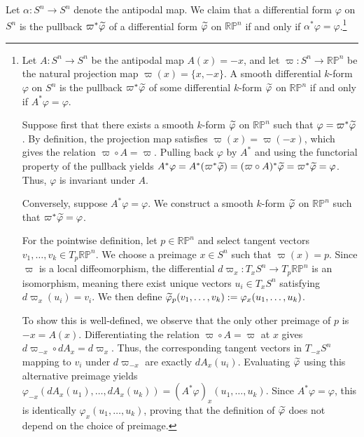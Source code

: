 \documentclass{article}
\begin{document}
	Let $\alpha: S^{n} \to S^{n}$ denote the antipodal map. We claim that a differential form $\varphi$ on $S^{n}$ is the pullback $\varpi^{\ast}\widetilde{\varphi}$ of a differential form $\widetilde{\varphi}$ on $\mathbb{RP}^{n}$ if and only if $\alpha^{\ast}\varphi = \varphi$.\footnote{
	Let $A: S^n \to S^n$ be the antipodal map $A(x) = -x$, and let $\varpi: S^n \to \mathbb{R}\mathbb{P}^n$ be the natural projection map $\varpi(x) = \{x, -x\}$. A smooth differential $k$-form $\varphi$ on $S^n$ is the pullback $\varpi^*\widetilde{\varphi}$ of some differential $k$-form $\widetilde{\varphi}$ on $\mathbb{R}\mathbb{P}^n$ if and only if $A^*\varphi = \varphi$.
	
	Suppose first that there exists a smooth $k$-form $\widetilde{\varphi}$ on $\mathbb{R}\mathbb{P}^n$ such that $\varphi = \varpi^*\widetilde{\varphi}$. By definition, the projection map satisfies $\varpi(x) = \varpi(-x)$, which gives the relation $\varpi \circ A = \varpi$. Pulling back $\varphi$ by $A^*$ and using the functorial property of the pullback yields $A^*\varphi = A^*(\varpi^*\widetilde{\varphi}) = (\varpi \circ A)^*\widetilde{\varphi} = \varpi^*\widetilde{\varphi} = \varphi$. Thus, $\varphi$ is invariant under $A$.
	
	Conversely, suppose $A^*\varphi = \varphi$. We construct a smooth $k$-form $\widetilde{\varphi}$ on $\mathbb{R}\mathbb{P}^n$ such that $\varpi^*\widetilde{\varphi} = \varphi$.
	
	For the pointwise definition, let $p \in \mathbb{R}\mathbb{P}^n$ and select tangent vectors $v_1, \dots, v_k \in T_p\mathbb{R}\mathbb{P}^n$. We choose a preimage $x \in S^n$ such that $\varpi(x) = p$. Since $\varpi$ is a local diffeomorphism, the differential $d\varpi_x: T_x S^n \to T_p\mathbb{R}\mathbb{P}^n$ is an isomorphism, meaning there exist unique vectors $u_i \in T_x S^n$ satisfying $d\varpi_x(u_i) = v_i$. We then define $\widetilde{\varphi}_p(v_1, \dots, v_k) := \varphi_x(u_1, \dots, u_k)$.
	
	To show this is well-defined, we observe that the only other preimage of $p$ is $-x = A(x)$. Differentiating the relation $\varpi \circ A = \varpi$ at $x$ gives $d\varpi_{-x} \circ dA_x = d\varpi_x$. Thus, the corresponding tangent vectors in $T_{-x}S^n$ mapping to $v_i$ under $d\varpi_{-x}$ are exactly $dA_x(u_i)$. Evaluating $\widetilde{\varphi}$ using this alternative preimage yields $\varphi_{-x}(dA_x(u_1), \dots, dA_x(u_k)) = (A^*\varphi)_x(u_1, \dots, u_k)$. Since $A^*\varphi = \varphi$, this is identically $\varphi_x(u_1, \dots, u_k)$, proving that the definition of $\widetilde{\varphi}$ does not depend on the choice of preimage.
	
}
\end{document}
